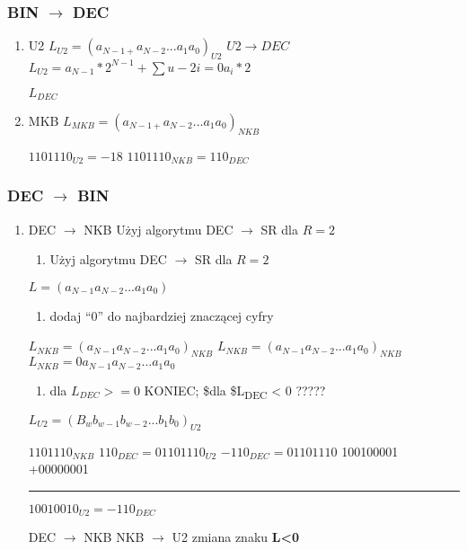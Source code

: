 \documentclass[11pt]{article}
\begin{document}
\subsubsection{BIN \(\to\) DEC}
\label{sec:org8bd6c27}
\begin{enumerate}
\item U2
\label{sec:org6a385a1}
\(L_{U2}= (a_{N-1+} a_{N-2} ... a_1 a_0)_{U2}\)
\(U2 \to DEC\)
\(L_{U2}= a_{N-1}*2^{N-1} + \sum{u-2}{i=0}a_i*2\)

\(L_{DEC}\)
\item MKB
\label{sec:org0c06a06}
\(L_{MKB}= (a_{N-1+} a_{N-2} ... a_1 a_0)_{NKB}\)

\(1101110_{U2} = -18\)
\(1101110_{NKB} = 110_{DEC}\)
\end{enumerate}
\subsubsection{DEC \(\to\) BIN}
\label{sec:org35731af}
\begin{enumerate}
\item DEC \(\to\) NKB
\label{sec:orgb43789f}
Użyj algorytmu DEC \(\to\) SR dla \(R=2\)
\begin{enumerate}
\item Użyj algorytmu DEC \(\to\) SR dla \(R=2\)
\end{enumerate}
\(L=(a_{N-1} a_{N-2} ... a_1 a_0)\)
\begin{enumerate}
\item dodaj ``0'' do najbardziej znaczącej cyfry
\end{enumerate}
\(L_{NKB}=(a_{N-1} a_{N-2} ... a_1 a_0)_{NKB}\)
\(L_{NKB}=(a_{N-1} a_{N-2} ... a_1 a_0)_{NKB}\)
\(L_{NKB}= 0 a_{N-1} a_{N-2} ... a_1 a_0\)
\begin{enumerate}
\item dla \(L_{DEC} >= 0\) KONIEC; \$dla \$L\textsubscript{DEC} < 0  ?????
\end{enumerate}
\(L_{U2}=(B_w b_{w-1} b_{w-2} ... b_1 b_0)_{U2}\)

\(1101110_{NKB}\)
\(110_{DEC} = 01101110_{U2}\)
\(-110_{DEC}=01101110\)
100100001
+00000001

\noindent\rule{\textwidth}{0.5pt}
\(10010010_{U2} = -110_{DEC}\)

DEC \(\to\) NKB
NKB \(\to\) U2
zmiana znaku \textbf{L<0}
\end{enumerate}
\end{document}
